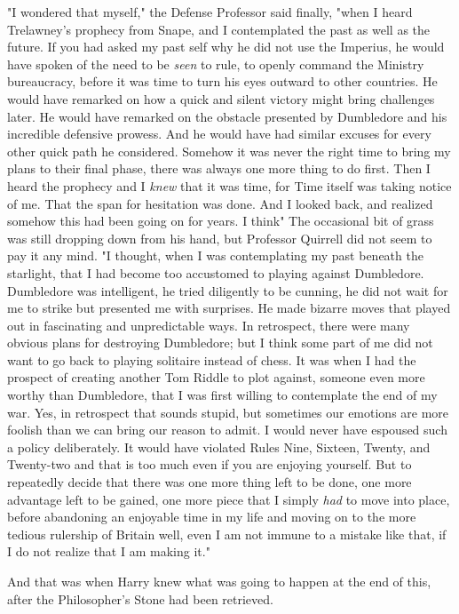 "I wondered that myself," the Defense Professor said finally, "when I heard
Trelawney's prophecy from Snape, and I contemplated the past as well as the
future. If you had asked my past self why he did not use the Imperius, he would
have spoken of the need to be \emph{seen} to rule, to openly command the
Ministry bureaucracy, before it was time to turn his eyes outward to other
countries. He would have remarked on how a quick and silent victory might bring
challenges later. He would have remarked on the obstacle presented by
Dumbledore and his incredible defensive prowess. And he would have had similar
excuses for every other quick path he considered. Somehow it was never the
right time to bring my plans to their final phase, there was always one more
thing to do first. Then I heard the prophecy and I \emph{knew} that it was
time, for Time itself was taking notice of me. That the span for hesitation was
done. And I looked back, and realized somehow this had been going on for years.
I think{\el}" The occasional bit of grass was still dropping down from his
hand, but Professor Quirrell did not seem to pay it any mind. "I thought, when
I was contemplating my past beneath the starlight, that I had become too
accustomed to playing against Dumbledore. Dumbledore was intelligent, he tried
diligently to be cunning, he did not wait for me to strike but presented me
with surprises. He made bizarre moves that played out in fascinating and
unpredictable ways. In retrospect, there were many obvious plans for destroying
Dumbledore; but I think some part of me did not want to go back to playing
solitaire instead of chess. It was when I had the prospect of creating another
Tom Riddle to plot against, someone even more worthy than Dumbledore, that I
was first willing to contemplate the end of my war. Yes, in retrospect that
sounds stupid, but sometimes our emotions are more foolish than we can bring
our reason to admit. I would never have espoused such a policy deliberately. It
would have violated Rules Nine, Sixteen, Twenty, and Twenty-two and that is too
much even if you are enjoying yourself. But to repeatedly decide that there was
one more thing left to be done, one more advantage left to be gained, one more
piece that I simply \emph{had} to move into place, before abandoning an
enjoyable time in my life and moving on to the more tedious rulership of
Britain{\el} well, even I am not immune to a mistake like that, if I do not
realize that I am making it."

And that was when Harry knew what was going to happen at the end of this, after
the Philosopher's Stone had been retrieved.


